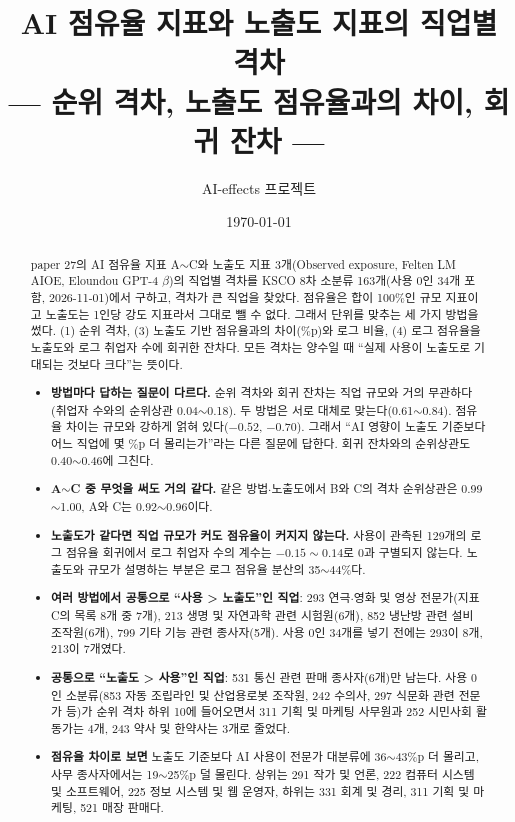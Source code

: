 \documentclass[11pt]{article}
\title{AI 점유율 지표와 노출도 지표의 직업별 격차\\[2mm]
\large --- 순위 격차, 노출도 점유율과의 차이, 회귀 잔차 ---}
\author{AI-effects 프로젝트}
\date{\today}
\begin{document}
\maketitle

\begin{abstract}
\noindent paper 27의 AI 점유율 지표 A$\sim$C와 노출도 지표 3개(Observed exposure, Felten LM AIOE, Eloundou GPT-4 $\beta$)의 직업별 격차를 KSCO 8차 소분류 163개(사용 0인 34개 포함, 2026-11-01)에서 구하고, 격차가 큰 직업을 찾았다. 점유율은 합이 100\%인 규모 지표이고 노출도는 1인당 강도 지표라서 그대로 뺄 수 없다. 그래서 단위를 맞추는 세 가지 방법을 썼다. (1) 순위 격차, (3) 노출도 기반 점유율과의 차이(\%p)와 로그 비율, (4) 로그 점유율을 노출도와 로그 취업자 수에 회귀한 잔차다. 모든 격차는 양수일 때 ``실제 사용이 노출도로 기대되는 것보다 크다''는 뜻이다.
\begin{itemize}[leftmargin=*]
  \item \textbf{방법마다 답하는 질문이 다르다.} 순위 격차와 회귀 잔차는 직업 규모와 거의 무관하다(취업자 수와의 순위상관 0.04$\sim$0.18). 두 방법은 서로 대체로 맞는다(0.61$\sim$0.84). 점유율 차이는 규모와 강하게 얽혀 있다($-0.52$, $-0.70$). 그래서 ``AI 영향이 노출도 기준보다 어느 직업에 몇 \%p 더 몰리는가''라는 다른 질문에 답한다. 회귀 잔차와의 순위상관도 0.40$\sim$0.46에 그친다.
  \item \textbf{A$\sim$C 중 무엇을 써도 거의 같다.} 같은 방법$\cdot$노출도에서 B와 C의 격차 순위상관은 0.99$\sim$1.00, A와 C는 0.92$\sim$0.96이다.
  \item \textbf{노출도가 같다면 직업 규모가 커도 점유율이 커지지 않는다.} 사용이 관측된 129개의 로그 점유율 회귀에서 로그 취업자 수의 계수는 $-0.15\sim0.14$로 0과 구별되지 않는다. 노출도와 규모가 설명하는 부분은 로그 점유율 분산의 35$\sim$44\%다.
  \item \textbf{여러 방법에서 공통으로 ``사용 > 노출도''인 직업}: 293 연극$\cdot$영화 및 영상 전문가(지표 C의 목록 8개 중 7개), 213 생명 및 자연과학 관련 시험원(6개), 852 냉난방 관련 설비 조작원(6개), 799 기타 기능 관련 종사자(5개). 사용 0인 34개를 넣기 전에는 293이 8개, 213이 7개였다.
  \item \textbf{공통으로 ``노출도 > 사용''인 직업}: 531 통신 관련 판매 종사자(6개)만 남는다. 사용 0인 소분류(853 자동 조립라인 및 산업용로봇 조작원, 242 수의사, 297 식문화 관련 전문가 등)가 순위 격차 하위 10에 들어오면서 311 기획 및 마케팅 사무원과 252 시민사회 활동가는 4개, 243 약사 및 한약사는 3개로 줄었다.
  \item \textbf{점유율 차이로 보면} 노출도 기준보다 AI 사용이 전문가 대분류에 36$\sim$43\%p 더 몰리고, 사무 종사자에서는 19$\sim$25\%p 덜 몰린다. 상위는 291 작가 및 언론, 222 컴퓨터 시스템 및 소프트웨어, 225 정보 시스템 및 웹 운영자, 하위는 331 회계 및 경리, 311 기획 및 마케팅, 521 매장 판매다.
\end{itemize}
\end{abstract}
\end{document}
